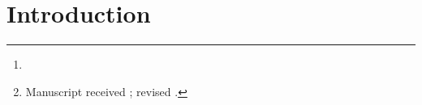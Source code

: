 \documentclass[journal]{IEEEtran}
\begin{document}
\title{}

\author{%
  ~\IEEEmembership{}%
\thanks{}%
\thanks{Manuscript received ; revised .}}

\markboth{}%
{}



\maketitle

\begin{abstract}

\end{abstract}

\begin{IEEEkeywords}

\end{IEEEkeywords}


\IEEEpeerreviewmaketitle

\section{Introduction}
\end{document}
